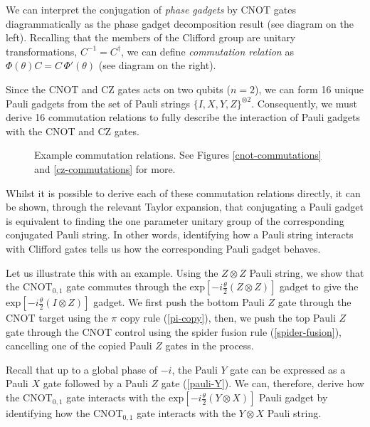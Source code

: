 We can interpret the conjugation of \textit{phase gadgets} by CNOT gates diagrammatically as the phase gadget decomposition result (see diagram on the left). Recalling that the members of the Clifford group are unitary transformations, $C^{-1} = C^\dagger$, we can define \textit{commutation relation} as $\Phi(\theta) C = C \, \Phi'(\theta)$ (see diagram on the right).


Since the CNOT and CZ gates acts on two qubits ($n=2$), we can form 16 unique Pauli gadgets from the set of Pauli strings $\{I, X, Y, Z\}^{\otimes 2}$. Consequently, we must derive 16 commutation relations to fully describe the interaction of Pauli gadgets with the CNOT and CZ gates.

\begin{figure}[H]
    \centering
    \caption{Example commutation relations. See Figures \ref{cnot-commutations} and \ref{cz-commutations} for more.}
\end{figure}

Whilst it is possible to derive each of these commutation relations directly, it can be shown, through the relevant Taylor expansion, that conjugating a Pauli gadget is equivalent to finding the one parameter unitary group of the corresponding conjugated Pauli string. In other words, identifying how a Pauli string interacts with Clifford gates tells us how the corresponding Pauli gadget behaves.

Let us illustrate this with an example. Using the $Z \otimes Z$ Pauli string, we show that the $\text{CNOT}_{0, 1}$ gate commutes through the $\text{exp} \left[ - i\frac{\theta}{2} \left( Z \otimes Z \right) \right]$ gadget to give the $\text{exp} \left[ - i\frac{\theta}{2} \left( I \otimes Z \right) \right]$ gadget. We first push the bottom Pauli $Z$ gate through the CNOT target using the $\pi$ copy rule (\ref{pi-copy}), then, we push the top Pauli $Z$ gate through the CNOT control using the spider fusion rule (\ref{spider-fusion}), cancelling one of the copied Pauli $Z$ gates in the process.


Recall that up to a global phase of $-i$, the Pauli $Y$ gate can be expressed as a Pauli $X$ gate followed by a Pauli $Z$ gate (\ref{pauli-Y}). We can, therefore, derive how the $\text{CNOT}_{0, 1}$ gate interacts with the $\text{exp} \left[ - i\frac{\theta}{2} \left(Y \otimes X \right) \right]$ Pauli gadget by identifying how the CNOT$_{0, 1}$ gate interacts with the $Y \otimes X$ Pauli string.

